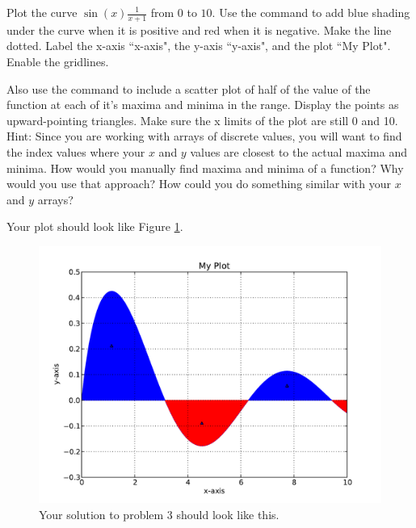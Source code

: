 \begin{problem} Plot the curve $\sin(x)\frac{1}{x+1}$ from $0$ to $10$.
Use the  command to add blue shading under the curve when it is positive and red when it is
negative.
Make the line dotted. Label the x-axis ``x-axis", the y-axis ``y-axis",
and the plot ``My Plot". Enable the gridlines.

Also use the  command to include a scatter plot of half of the value of the function at each
of it's maxima and minima in the range. Display the points as
upward-pointing triangles. Make sure the x limits of the plot are still 0 and 10.
Hint: Since you are working with arrays of discrete values, you will want to find the index values where your $x$ and $y$ values are closest to the actual maxima and minima. How would you manually find maxima and minima of a function? Why would you use that approach? How could you do something similar with your $x$ and $y$ arrays?

Your plot should look like Figure \ref{mpl:problem3}.
\end{problem}

\begin{figure}
\includegraphics[width=\textwidth]{prob3.pdf}
\caption{Your solution to problem 3 should look like this.}
\label{mpl:problem3} 
\end{figure}

